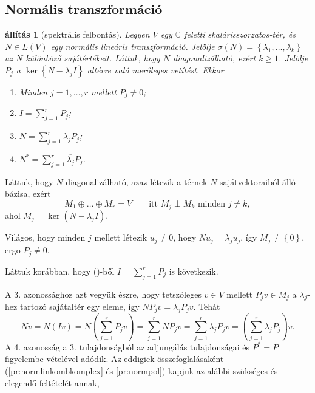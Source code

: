 \documentclass[9pt, a4paper, showtrims]{memoir}
\makeatletter
\renewenvironment{proof}[1][\proofname]
    {\par\pushQED{\qed}%
    \normalfont \topsep6\p@\@plus6\p@\relax
    \trivlist
    \item[\hskip\labelsep
        \itshape
    #1\@addpunct{:}]\ignorespaces}
    {\popQED\endtrivlist\@endpefalse}
\theoremstyle{plain}
\newtheorem{proposition}{állítás}[chapter]
\theoremstyle{remark}
\theoremstyle{definition}
\makeatother
\begin{document}
\subsection{Normális transzformáció}
\begin{proposition}[spektrális felbontás]
    Legyen $V$ egy $\mathbb{C}$ feletti skalárisszorzatos-tér, és $N\in L\left( V \right)$
    egy normális lineáris transzformáció.
    Jelölje $\sigma\left( N \right)=\left\{\lambda_1,\dots,\lambda_k  \right\}$ az $N$ különböző sajátértékeit.
    Láttuk, hogy $N$ diagonalizálható, ezért $k\geq 1$.
    Jelölje $P_j$ a $\ker\left\{ N-\lambda_jI \right\}$ altérre való merőleges vetítést.
    Ekkor
    \begin{enumerate}
        \item Minden $j=1,\dots,r$ mellett $P_j\neq 0$;
        \item $I=\sum_{j=1}^rP_j$;
        \item $N=\sum_{j=1}^r\lambda_jP_j$;
        \item $N^\ast=\sum_{j=1}^r\overline{\lambda_j}P_j$.
            \qedhere
    \end{enumerate}
\end{proposition}
\begin{proof}
    Láttuk, hogy $N$ diagonalizálható, azaz létezik a térnek $N$ sajátvektoraiból álló
    bázisa,
    ezért
    \[
        M_1\oplus\dots\oplus M_r=V
        \qquad\text{itt }M_j\perp M_k\text{ minden }j\neq k,\tag{\dag}
    \]
    ahol $M_j=\ker\left( N-\lambda_jI \right)$.

    Világos, 
    hogy minden $j$ mellett létezik $u_j\neq 0$, hogy $Nu_j=\lambda_ju_j$, 
    így $M_j\neq \left\{ 0 \right\}$,
    ergo $P_j\neq 0.$

    Láttuk korábban, hogy (\dag)-ből $I=\sum_{j=1}^{r}P_j$ is következik.

    A 3. azonossághoz azt vegyük észre, 
    hogy tetszőleges $v\in V$ mellett $P_jv\in M_j$ a $\lambda_j$-hez tartozó sajátaltér egy eleme,
    így $NP_jv=\lambda_jP_jv$. Tehát
    \[
        Nv
        =
        N\left( Iv \right)
        =
        N\left( \sum_{j=1}^rP_jv \right)
        =
        \sum_{j=1}^rNP_jv
        =
        \sum_{j=1}^r\lambda_jP_jv
        =
        \left( \sum_{j=1}^r\lambda_jP_j \right)v.
    \]
    A 4. azonosság a 3. tulajdonságból az adjungálás tulajdonságai és $P^\ast=P$ figyelembe vételével adódik.
\end{proof}
Az eddigiek összefoglalásaként (\ref{pr:normlinkombkomplex} és \ref{pr:normpol}) kapjuk az alábbi szükséges és elegendő feltételét annak,
\end{document}
